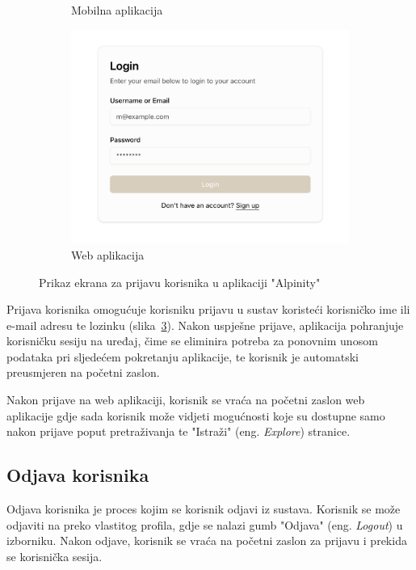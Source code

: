 \begin{figure}[H]
\begin{subfigure}{.35\textwidth}
    \caption{Mobilna aplikacija}
    \label{fig:prijava1}
  \end{subfigure}%
  \begin{subfigure}{.6\textwidth}
    \centering
    \includegraphics[width=1\linewidth]{images/implementacija/web/login.png}
    \caption{Web aplikacija}
    \label{fig:prijava2}
  \end{subfigure}
  \caption{Prikaz ekrana za prijavu korisnika u aplikaciji "Alpinity"}
  \label{fig:prijava_usporedba}
  \end{figure}

Prijava korisnika omogućuje korisniku prijavu u sustav koristeći korisničko ime ili e-mail adresu te lozinku (slika~\ref{fig:prijava_usporedba}). Nakon uspješne prijave, aplikacija pohranjuje korisničku sesiju na uređaj, čime se eliminira potreba za ponovnim unosom podataka pri sljedećem pokretanju aplikacije, te korisnik je automatski preusmjeren na početni zaslon.

Nakon prijave na web aplikaciji, korisnik se vraća na početni zaslon web aplikacije gdje sada korisnik može vidjeti mogućnosti koje su dostupne samo nakon prijave poput pretraživanja te "Istraži" (eng. \textit{Explore}) stranice.


\subsection{Odjava korisnika}

Odjava korisnika je proces kojim se korisnik odjavi iz sustava. Korisnik se može odjaviti na preko vlastitog profila, gdje se nalazi gumb "Odjava" (eng. \textit{Logout}) u izborniku. Nakon odjave, korisnik se vraća na početni zaslon za prijavu i prekida se korisnička sesija.

